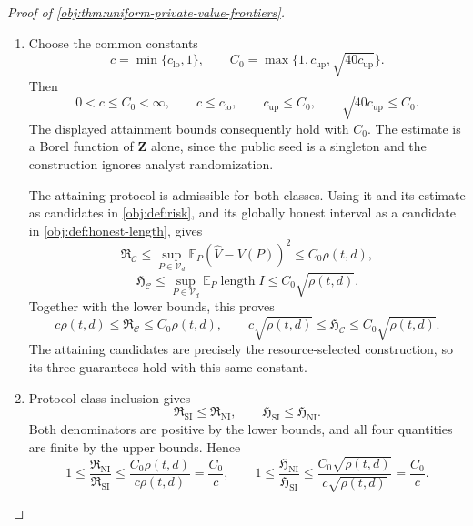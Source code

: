 \begin{proof}[Proof of \cref{obj:thm:uniform-private-value-frontiers}]
\begin{enumerate}
For \(V(P)\in[1/4,3/4]\), failure of coverage implies
\(|\widehat V-V(P)|>q_*\). Markov's inequality therefore gives
\[
\Pr_P\{V(P)\notin I\}
\le\Pr_P\{(\widehat V-V(P))^2\ge q_*^2\}
\le\frac{10^{16}\rho(t,d)}{10^{17}\rho(t,d)}
=\frac1{10}.
\]
Clipping the endpoints gives
\[
\operatorname{length}I\le2q_*
=\sqrt{40c_{\mathrm{up}}}\,\sqrt{\rho(t,d)}.
\]
Thus the same noninteractive protocol, transcript-only estimator, and interval simultaneously satisfy
\[
\mathbb E_P(\widehat V-V(P))^2\le c_{\mathrm{up}}\rho(t,d),
\qquad
\Pr_P\{V(P)\in I\}\ge0.90,
\qquad
\mathbb E_P\operatorname{length}I
\le\sqrt{40c_{\mathrm{up}}}\,\sqrt{\rho(t,d)}.
\]
These hold for every \(P\in\mathcal V_d\), including the \(n=2\) branch.

\item
Choose the common constants
\[
c=\min\{c_{\mathrm{lo}},1\},
\qquad
C_0=\max\{1,c_{\mathrm{up}},\sqrt{40c_{\mathrm{up}}}\}.
\]
Then
\[
0<c\le C_0<\infty,\qquad
c\le c_{\mathrm{lo}},\qquad
c_{\mathrm{up}}\le C_0,\qquad
\sqrt{40c_{\mathrm{up}}}\le C_0.
\]
The displayed attainment bounds consequently hold with \(C_0\).
The estimate is a Borel function of \(\mathbf Z\) alone, since the public seed is a singleton and the construction ignores analyst randomization.

The attaining protocol is admissible for both classes. Using it and its estimate as candidates in \cref{obj:def:risk}, and its globally honest interval as a candidate in \cref{obj:def:honest-length}, gives
\[
\mathfrak R_{\mathcal C}
\le\sup_{P\in\mathcal V_d}\mathbb E_P(\widehat V-V(P))^2
\le C_0\rho(t,d),
\]
\[
\mathfrak H_{\mathcal C}
\le\sup_{P\in\mathcal V_d}\mathbb E_P\operatorname{length}I
\le C_0\sqrt{\rho(t,d)}.
\]
Together with the lower bounds, this proves
\[
c\rho(t,d)\le\mathfrak R_{\mathcal C}\le C_0\rho(t,d),
\qquad
c\sqrt{\rho(t,d)}
\le\mathfrak H_{\mathcal C}\le C_0\sqrt{\rho(t,d)}.
\]
The attaining candidates are precisely the resource-selected construction, so its three guarantees hold with this same constant.

\item
Protocol-class inclusion gives
\[
\mathfrak R_{\mathrm{SI}}\le\mathfrak R_{\mathrm{NI}},
\qquad
\mathfrak H_{\mathrm{SI}}\le\mathfrak H_{\mathrm{NI}}.
\]
Both denominators are positive by the lower bounds, and all four quantities are finite by the upper bounds. Hence
\[
1\le\frac{\mathfrak R_{\mathrm{NI}}}{\mathfrak R_{\mathrm{SI}}}
\le\frac{C_0\rho(t,d)}{c\rho(t,d)}
=\frac{C_0}{c},
\qquad
1\le\frac{\mathfrak H_{\mathrm{NI}}}{\mathfrak H_{\mathrm{SI}}}
\le\frac{C_0\sqrt{\rho(t,d)}}{c\sqrt{\rho(t,d)}}
=\frac{C_0}{c}.
\]


\end{enumerate}
\end{proof}

